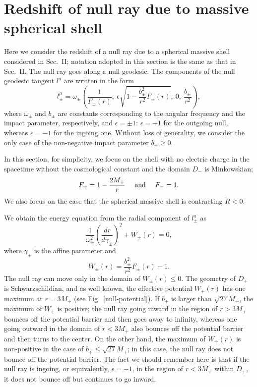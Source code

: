 \documentclass[aps,preprint,preprintnumber,nofootinbib,amsmath,amssymb,ascmac,bm,12pt]{revtex4}
\begin{document}
\appendix

\section{Redshift of null ray due to massive spherical shell}

Here we consider the redshift of a null ray due to a spherical massive shell considered in Sec.~II; notation
adopted in this section is the same as that in Sec.~II. The null ray goes along a null geodesic. 
The components of the null geodesic tangent $l^a$ are written in the form
\begin{equation}
l^{\mu}_\pm=\omega_\pm\left(\frac{1}{F_\pm(r)},~\epsilon \sqrt{1-\frac{b_\pm^2}{r^2}F_\pm(r)},
~0,~\frac{b_\pm}{r^2}\right),  \label{null}
\end{equation}
where $\omega_\pm$ and $b_\pm$ are constants corresponding to the angular frequency and 
the impact parameter, respectively, and $\epsilon=\pm1$: $\epsilon=+1$ for the outgoing null, 
whereas $\epsilon=-1$ for the ingoing one. Without loss of generality, we consider the only case of 
the non-negative impact parameter $b_\pm\geq0$. 

In this section, for simplicity, we focus on the shell with no electric charge in the spacetime without the 
cosmological constant and the domain $D_-$ is Minkowskian;
$$
F_+=1-\frac{2M_+}{r}~~~~{\rm and}~~~~F_-=1.
$$
We also focus on the case that the spherical massive shell is contracting $\dot{R}<0$. 
 
We obtain the energy equation from the radial component of $l_\pm^a$ as
\begin{equation}
\frac{1}{\omega_\pm^2}\left(\frac{dr}{d\gamma_\pm}\right)^2+W_\pm(r)=0,
\end{equation}
where $\gamma_\pm$ is the affine parameter and
\begin{equation}
W_\pm(r)=\frac{b_\pm^2}{r^2}F_\pm(r)-1.
\end{equation}
The null ray can move only in the domain of $W_\pm(r)\leq0$. 
The geometry of $D_+$ is Schwarzschildian, and as well known, the effective potential 
$W_+(r)$ has one maximum at $r=3M_+$ (see Fig.~\ref{null-potential}). 
If $b_+$ is larger than $\sqrt{27}M_+$, 
the maximum of $W_+$ is positive; the null ray going inward in the region of $r>3M_+$ 
bounces off the potential barrier and then goes away to infinity, whereas one going outward in 
the domain of $r<3M_+$ also bounces off the potential barrier and then turns to the center. 
On the other hand, the maximum of $W_+(r)$ is non-positive in the case of $b_+\leq\sqrt{27}M_+$;   
in this case, the null ray does not bounce off the potential barrier. The fact we should remember here 
is that if the null ray is ingoing, or equivalently, $\epsilon=-1$, 
in the region of $r<3M_+$ within $D_+$, 
it does not bounce off but continues to go inward. 
\end{document}
